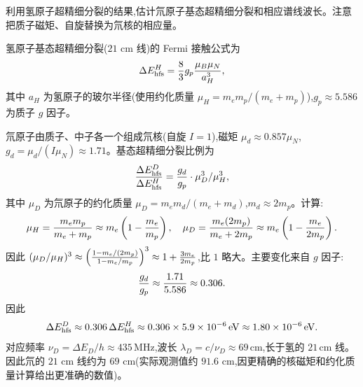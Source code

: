 \begin{question}
利用氢原子超精细分裂的结果,估计氘原子基态超精细分裂和相应谱线波长。注意把质子磁矩、自旋替换为氘核的相应量。
\begin{solution}
氢原子基态超精细分裂($21$ cm 线)的 Fermi 接触公式为
\[
\Delta E_{\rm hfs}^H = {8\over3}g_p{\mu_B\mu_N\over a_H^3},
\]
其中 $a_H$ 为氢原子的玻尔半径(使用约化质量 $\mu_H=m_e m_p/(m_e+m_p)$),$g_p\approx5.586$ 为质子 $g$ 因子。

氘原子由质子、中子各一个组成氘核(自旋 $I=1$),磁矩 $\mu_d\approx0.857\mu_N$,$g_d=\mu_d/(I\mu_N)\approx1.71$。基态超精细分裂比例为
\[
{\Delta E_{\rm hfs}^D\over\Delta E_{\rm hfs}^H}
= {g_d\over g_p}\cdot{\mu_D^3/\mu_H^3},
\]
其中 $\mu_D$ 为氘原子的约化质量 $\mu_D=m_e m_d/(m_e+m_d)$,$m_d\approx2m_p$。计算:
\[
\mu_H = {m_e m_p\over m_e+m_p}\approx m_e\left(1-{m_e\over m_p}\right),\quad
\mu_D = {m_e(2m_p)\over m_e+2m_p}\approx m_e\left(1-{m_e\over2m_p}\right).
\]
因此 $(\mu_D/\mu_H)^3 \approx \left({1-m_e/(2m_p)\over1-m_e/m_p}\right)^3 \approx 1 + {3m_e\over2m_p}$,比 $1$ 略大。主要变化来自 $g$ 因子:
\[
{g_d\over g_p} \approx {1.71\over5.586}\approx0.306.
\]
因此
\[
\Delta E_{\rm hfs}^D \approx 0.306\,\Delta E_{\rm hfs}^H \approx 0.306\times5.9\times10^{-6}\,\mathrm{eV} \approx 1.80\times10^{-6}\,\mathrm{eV}.
\]
对应频率 $\nu_D=\Delta E_D/h \approx 435\,\mathrm{MHz}$,波长 $\lambda_D=c/\nu_D \approx 69\,\mathrm{cm}$,长于氢的 $21\,\mathrm{cm}$ 线。因此氘的 $21$ cm 线约为 $69$ cm(实际观测值约 $91.6$ cm,因更精确的核磁矩和约化质量计算给出更准确的数值)。
\end{solution}
\end{question}

